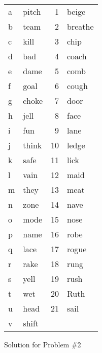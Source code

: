 \documentclass[11pt]{article}
\begin{document}
\begin{problem}{2}
\begin{description}
	\begin{tabular}{l p{6cm} | r l}
		a & pitch &   1 & beige \\
		b & team & 2 & breathe \\  
		c & kill & 3 & chip \\  
		d & bad & 4 & coach \\  
		e & dame & 5 & comb \\  
		f & goal & 6 & cough \\  
		g & choke & 7 & door \\  
		h & jell & 8 & face \\  
		i & fun & 9 & lane \\  
		j & think & 10 & ledge \\  
		k & safe & 11 & lick \\  
		l & vain & 12 & maid \\  
		m & they & 13 & meat \\  
		n & zone & 14 & nave \\  
		o & mode & 15 & nose \\  
		p & name & 16 & robe \\  
		q & lace & 17 & rogue \\  
		r & rake & 18 & rung \\  
		s & yell & 19 & rush \\  
		t & wet & 20 & Ruth \\  
		u & head & 21 & sail \\  
		v & shift &  & 
	\end{tabular}

\end{description}

\end{problem}

\begin{solution}
Solution for Problem \#2
\end{solution}
\end{document}
